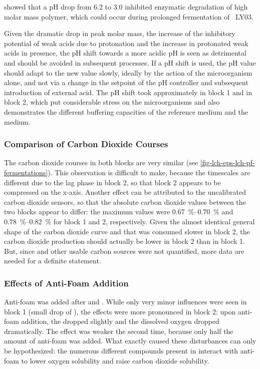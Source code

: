 \textcite{Degeest2002} showed that a pH drop from \num{6.2} to \num{3.0} inhibited enzymatic degradation of high molar mass polymer, which could occur during prolonged fermentation of ~LY03.

Given the dramatic drop in peak molar mass, the increase of the inhibitory potential of weak acids due to protonation \cite{Axe1995, Pampulha1989, Stouthamer1979, Verduyn1990, Verduyn1992, Warth1988} and the increase in protonated weak acids in \lch{} presence, the pH shift towards a more acidic pH is seen as detrimental and should be avoided in subsequent processes. If a pH shift is used, the pH value should adapt to the new value slowly, ideally by the action of the microorganism alone, and not via a change in the setpoint of the pH controller and subsequent introduction of external acid. The pH shift took approximately  in block 1 and  in block 2, which put considerable stress on the microorganisms and also demonstrates the different buffering capacities of the reference medium and the \lch{} medium.

\subsubsection{Comparison of Carbon Dioxide Courses}
The carbon dioxide courses in both blocks are very similar (see \vref{fig-lch-eps-lch-pf-fermentations}). This observation is difficult to make, because the timescales are different due to the lag phase in block 2, so that block 2 appears to be compressed on the x-axis. Another effect can be attributed to the uncalibrated carbon dioxide sensors, so that the absolute carbon dioxide values between the two blocks appear to differ: the maximum values were \SIrange{0.67}{0.70}{\percent} and \SIrange{0.78}{0.82}{\percent} for block 1 and 2, respectively. Given the almost identical general shape of the carbon dioxide curve and that \glc{} was consumed slower in block 2, the carbon dioxide production should actually be lower in block 2 than in block 1. But, since \xyl{} and other usable carbon sources were not quantified, more data are needed for a definite statement.

\subsubsection{Effects of Anti-Foam Addition\label{subsubsec-lch-eps-disc-lch-pf-antifoam}}
Anti-foam was added after  and . While only very minor influences were seen in block 1 (small drop of ), the effects were more pronounced in block 2: upon anti-foam addition, the  dropped slightly and the dissolved oxygen dropped dramatically. The effect was weaker the second time, because only half the amount of anti-foam was added. What exactly caused these disturbances can only be hypothesized: the numerous different compounds present in \lch{} interact with anti-foam to lower oxygen solubility and raise carbon dioxide solubility.

